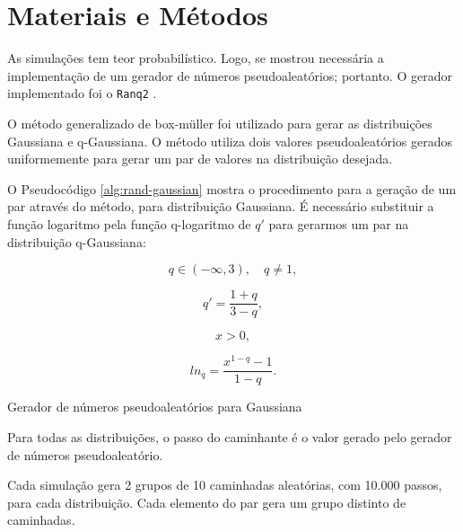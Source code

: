 
\section{Materiais e Métodos}

As simulações tem teor probabilístico. Logo, se mostrou necessária a
implementação de um gerador de números pseudoaleatórios; portanto. O gerador
implementado foi o \texttt{Ranq2} \cite{Press:Numerical:Recipes}.

\vspace{5mm}
O método generalizado de box-müller \cite{Tsallis:2007:GeneralizedBoxMuller}
foi utilizado para gerar as distribuições Gaussiana e q-Gaussiana. O método
utiliza dois valores pseudoaleatórios gerados uniformemente para gerar um par
de valores na distribuição desejada.

\vspace{5mm}
O Pseudocódigo \ref{alg:rand-gaussian} mostra o procedimento para a geração
de um par através do método, para distribuição Gaussiana. É necessário
substituir a função logaritmo pela função q-logaritmo de $q\prime$ para
gerarmos um par na distribuição q-Gaussiana:

\begin{equation}
  q \in (-\infty, 3), \quad q \neq 1,
\end{equation}

\begin{equation}
  q\prime = \frac{1+q}{3-q},
\end{equation}

\begin{equation}
  x > 0,
\end{equation}

\begin{equation}
  ln_q = \frac{x^{1-q}-1}{1-q}.
\end{equation}

\begin{algorithm}
  \caption{Gerador de números pseudoaleatórios para Gaussiana}
  \label{alg:rand-gaussian}

  \begin{algorithmic}[1]
    \Statex

       \Comment{$n \in [0,1)$}
      \Statex

      \Statex
    \EndFunction
  \end{algorithmic}
\end{algorithm}

\vspace{5mm}
Para todas as distribuições, o passo do caminhante é o valor gerado pelo gerador
de números pseudoaleatório.

\vspace{5mm}
Cada simulação gera 2 grupos de 10 caminhadas aleatórias, com 10.000 passos,
para cada distribuição. Cada elemento do par gera um grupo distinto de
caminhadas.
